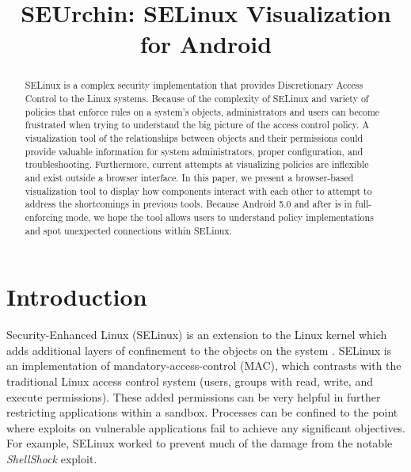 \documentclass[conference]{IEEEtran}
\begin{document}
\title{SEUrchin: SELinux Visualization for Android}
\author{
\and
{}
\and
{}
}
\maketitle

\begin{abstract}
SELinux is a complex security implementation that provides Discretionary Access Control to the Linux systems.  Because of the complexity of SELinux and variety of policies that enforce rules on a system's objects, administrators and users can become frustrated when trying to understand the big picture of the access control policy. A visualization tool of the relationships between objects and their permissions could provide valuable information for system administrators, proper configuration, and troubleshooting.  Furthermore, current attempts at visualizing policies are inflexible and exist outside a browser interface.  In this paper, we present a browser-based visualization tool to display how components interact with each other to attempt to address the shortcomings in previous tools.  Because Android 5.0 and after is in full-enforcing mode, we hope the tool allows users to understand policy implementations and spot unexpected connections within SELinux.
\end{abstract}

\IEEEpeerreviewmaketitle
\section{Introduction}
Security-Enhanced Linux (SELinux) is an extension to the Linux kernel which adds additional layers of confinement to the objects on the system \cite{loscocco2001meeting}. SELinux is an implementation of mandatory-access-control (MAC), which contrasts with the traditional Linux access control system (users, groups with read, write, and execute permissions). These added permissions can be very helpful in further restricting applications within a sandbox. Processes can be confined to the point where exploits on vulnerable applications fail to achieve any significant objectives. For example, SELinux worked to prevent much of the damage from the notable \emph{ShellShock} exploit\cite{shellshock}.
\end{document}
